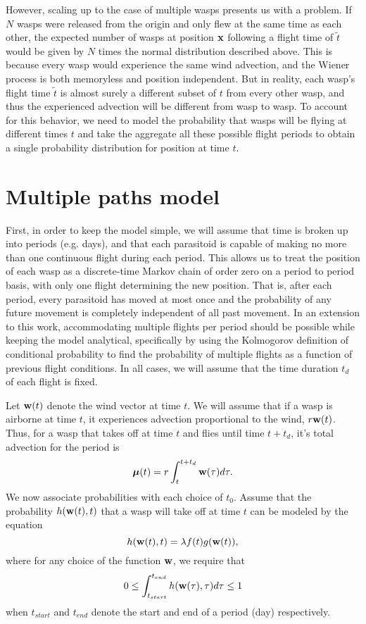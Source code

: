 \documentclass[12pt,english]{article}
\begin{document}
However, scaling up to the case of multiple wasps presents us with a problem. If $N$ wasps were released from the origin and only flew at the same time as each other, the expected number of wasps at position $\mathbf{x}$ following a flight time of $\tilde{t}$ would be given by $N$ times the normal distribution described above. This is because every wasp would experience the same wind advection, and the Wiener process is both memoryless and position independent. But in reality, each wasp's flight time $\tilde{t}$ is almost surely a different subset of $t$ from every other wasp, and thus the experienced advection will be different from wasp to wasp. To account for this behavior, we need to model the probability that wasps will be flying at different times $t$ and take the aggregate all these possible flight periods to obtain a single probability distribution for position at time $t$.

\section*{Multiple paths model}

First, in order to keep the model simple, we will assume that time is broken up into periods (e.g. days), and that each parasitoid is capable of making no more than one continuous flight during each period. This allows us to treat the position of each wasp as a discrete-time Markov chain of order zero on a period to period basis, with only one flight determining the new position. That is, after each period, every parasitoid has moved at most once and the probability of any future movement is completely independent of all past movement. In an extension to this work, accommodating multiple flights per period should be possible while keeping the model analytical, specifically by using the Kolmogorov definition of conditional probability to find the probability of multiple flights as a function of previous flight conditions. In all cases, we will assume that the time duration $t_d$ of each flight is fixed.

Let $\mathbf{w}(t)$ denote the wind vector at time $t$. We will assume that if a wasp is airborne at time $t$, it experiences advection proportional to the wind, $r\mathbf{w}(t)$. Thus, for a wasp that takes off at time $t$ and flies until time $t+t_d$, it's total advection for the period is
\begin{equation}
\boldsymbol\mu(t) = r\int_{t}^{t+t_d}\mathbf{w}(\tau)d\tau.\label{eqn:advec}
\end{equation}
We now associate probabilities with each choice of $t_0$. Assume that the probability $h(\mathbf{w}(t),t)$ that a wasp will take off at time $t$ can be modeled by the equation
\begin{equation}
h(\mathbf{w}(t),t) = \lambda f(t)g(\mathbf{w}(t)),\label{eqn:advec_prob}
\end{equation}
where for any choice of the function $\mathbf{w}$, we require that
\begin{equation*}
0\leq\int_{t_{start}}^{t_{end}} h(\mathbf{w}(\tau),\tau)d\tau\leq 1
\end{equation*}
when $t_{start}$ and $t_{end}$ denote the start and end of a period (day) respectively.
\end{document}
